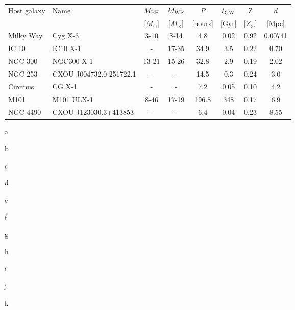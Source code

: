 \documentclass[a4paper,titlepage]{book}     	%
\newcommand{\sun}{\ensuremath{_\odot}}
\newcommand{\msun}{\ensuremath{M\sun}}
\newcommand{\zsun}{\ensuremath{Z\sun}}
\begin{document}
\begin{figure}[b!]
    \centering
	\begin{threeparttable}
		\begin{tabular}{llcccccc}
			\toprule
			\multirow{2}{*}{Host galaxy} & \multirow{2}{*}{Name} & $M_{\rm BH}$ & $M_{\rm WR}$ & $P$ & $t_\textup{GW}$  &  Z & $d$ \\
			& & [$\msun$] & [$\msun$] & [hours] & [Gyr] & [$\zsun$] & [Mpc]\\
			\midrule
			Milky Way & Cyg X-3 & 3-10 \tnote{a} & 8-14 \tnote{a} &4.8 \tnote{b} & 0.02 & 0.92 & 0.00741 \\
			IC 10 & IC10 X-1 & - \tnote{c} & 17-35 \tnote{d} & 34.9 \tnote{e} & 3.5  & 0.22 & 0.70\\
			NGC 300 & NGC300 X-1 & 13-21 \tnote{f} & 15-26 \tnote{g} & 32.8 \tnote{f} & 2.9  & 0.19 & 2.02\\
			NGC 253 & CXOU J004732.0-251722.1 & - & - & 14.5 \tnote{h} & 0.3  & 0.24 & 3.0 \\
			Circinus & CG X-1 & - & - & 7.2 \tnote{i}  & 0.05 & 0.10 & 4.2 \\
			M101 & M101 ULX-1 & 8-46 \tnote{j} & 17-19 \tnote{j} & 196.8 \tnote{j} & 348 & 0.17 & 6.9\\
			NGC 4490 & CXOU J123030.3+413853 & - & - & 6.4 \tnote{k} & 0.04  & 0.23 & 8.55\\
			\bottomrule 	
		\end{tabular}
		\begin{tablenotes}[para]
		    \item[a]\cite{CygX-3_Koljonen2017} 
		    \item[b]\cite{CygX-3_Singh2002} 
			\item[c]\cite{ICX10X-1_Laycock2015_revisited} 
			\item[d]\cite{IC10X-1_Clark2004_WRmass}
			\item[e]\cite{IC10X-1_Silverman2008} 
			\item[f]\cite{NGC300X-1_Binder2021_BHpreciso}
		    \item[g]\cite{NGC300X-1_Crowther2010} 
		    \item[h]\cite{NGC253cand_Maccarone2014} 
		    \item[i]\cite{observations}
		    \item[j]\cite{M101ULX-1_Liu2013} 
		    \item[k]\cite{NGC4490cand_Esposito2013c} 
		\end{tablenotes}
	\end{threeparttable}

\end{figure}
\end{document}
